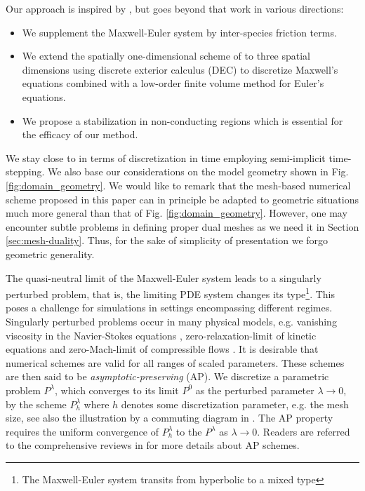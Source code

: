 \documentclass{article}
\begin{document}
Our approach is inspired by \cite{degond_2012}, but goes beyond that work in various directions:
\begin{itemize}
    \item We supplement the Maxwell-Euler system by inter-species friction terms.
    \item We extend the spatially one-dimensional scheme of \cite{degond_2012} to three spatial dimensions using discrete exterior calculus (DEC) to discretize Maxwell's equations combined with a low-order finite volume method for Euler's equations.
    \item We propose a stabilization in non-conducting regions which is essential for the efficacy of our method.
\end{itemize}

We stay close to \cite{degond_2012} in terms of discretization in time employing semi-implicit time-stepping. We also base our considerations on the model geometry shown in Fig. \ref{fig:domain_geometry}. We would like to remark that the mesh-based numerical scheme proposed in this paper can in principle be adapted to geometric situations much more general than that of Fig. \ref{fig:domain_geometry}. However, one may encounter subtle problems in defining proper dual meshes as we need it in Section \ref{sec:mesh-duality}. Thus, for the sake of simplicity of presentation we forgo geometric generality.

The quasi-neutral limit of the Maxwell-Euler system leads to a singularly perturbed problem, that is, the limiting PDE system changes its type\footnote{The Maxwell-Euler system transits from hyperbolic to a mixed type}. This poses a challenge for simulations in settings encompassing different regimes. Singularly perturbed problems occur in many physical models, e.g. vanishing viscosity in the Navier-Stokes equations \cite{Kato_1984}, zero-relaxation-limit of kinetic equations \cite{jin_2010} and zero-Mach-limit of compressible flows \cite{degond_2007, haack_2010}. It is desirable that numerical schemes are valid for all ranges of scaled parameters. These schemes are then said to be \emph{asymptotic-preserving} (AP). We discretize a parametric problem $P^\lambda$, which converges to its limit $P^0$ as the perturbed parameter $\lambda \rightarrow 0$, by the scheme $P^\lambda_h$ where $h$ denotes some discretization parameter, e.g. the mesh size, see also the illustration by a commuting diagram in \cite[][Fig. 1]{jin_2010}. The AP property requires the uniform convergence of $P^\lambda_h$ to the $P^\lambda$ as $\lambda\rightarrow0$. Readers are referred to the comprehensive reviews in \cite{jin_2010, degond_2017} for more details about AP schemes.
\end{document}
